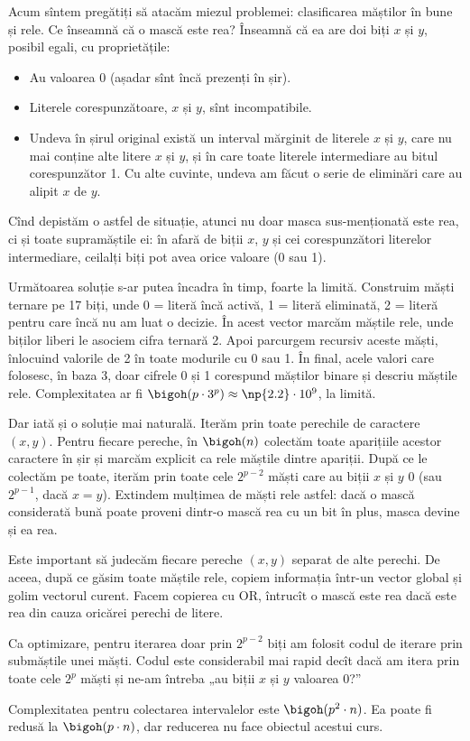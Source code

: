 Acum sîntem pregătiți să atacăm miezul problemei: clasificarea măștilor în bune și rele. Ce înseamnă că o mască este rea? Înseamnă că ea are doi biți $x$ și $y$, posibil egali, cu proprietățile:

\begin{itemize}
  \item Au valoarea 0 (așadar sînt încă prezenți în șir).

  \item Literele corespunzătoare, $x$ și $y$, sînt incompatibile.

  \item Undeva în șirul original există un interval mărginit de literele $x$ și $y$, care nu mai conține alte litere $x$ și $y$, și în care toate literele intermediare au bitul corespunzător 1. Cu alte cuvinte, undeva am făcut o serie de eliminări care au alipit $x$ de $y$.
\end{itemize}

Cînd depistăm o astfel de situație, atunci nu doar masca sus-menționată este rea, ci și toate supramăștile ei: în afară de biții $x$, $y$ și cei corespunzători literelor intermediare, ceilalți biți pot avea orice valoare (0 sau 1).

Următoarea soluție s-ar putea încadra în timp, foarte la limită. Construim măști ternare pe 17 biți, unde 0 = literă încă activă, 1 = literă eliminată, 2 = literă pentru care încă nu am luat o decizie. În acest vector marcăm măștile rele, unde biților liberi le asociem cifra ternară 2. Apoi parcurgem  recursiv aceste măști, înlocuind valorile de 2 în toate modurile cu 0 sau 1. În final, acele valori care folosesc, în baza 3, doar cifrele 0 și 1 corespund măștilor binare și descriu măștile rele. Complexitatea ar fi $\bigoh(p \cdot 3^p) \approx \np{2.2} \cdot 10^9$, la limită.

Dar iată și o soluție mai naturală. Iterăm prin toate perechile de caractere $(x,y)$. Pentru fiecare pereche, în $\bigoh(n)$ colectăm toate aparițiile acestor caractere în șir și marcăm explicit ca rele măștile dintre apariții. După ce le colectăm pe toate, iterăm prin toate cele $2^{p-2}$ măști care au biții $x$ și $y$ 0 (sau $2^{p-1}$, dacă $x=y$). Extindem mulțimea de măști rele astfel: dacă o mască considerată bună poate proveni dintr-o mască rea cu un bit în plus, masca devine și ea rea.

Este important să judecăm fiecare pereche $(x,y)$ separat de alte perechi. De aceea, după ce găsim toate măștile rele, copiem informația într-un vector global și golim vectorul curent. Facem copierea cu OR, întrucît o mască este rea dacă este rea din cauza oricărei perechi de litere.

Ca optimizare, pentru iterarea doar prin $2^{p-2}$ biți am folosit codul de iterare prin submăștile unei măști. Codul este considerabil mai rapid decît dacă am itera prin toate cele $2^p$ măști și ne-am întreba „au biții $x$ și $y$ valoarea 0?”

Complexitatea pentru colectarea intervalelor este $\bigoh(p^2 \cdot n)$. Ea poate fi redusă la $\bigoh(p \cdot n)$, dar reducerea nu face obiectul acestui curs.
